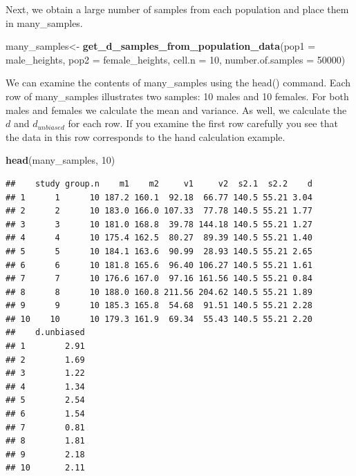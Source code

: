 \documentclass[
]{krantz}
\makeatletter
\newenvironment{Shaded}{\begin{snugshade}}{\end{snugshade}}
\newcommand{\DataTypeTok}[1]{\textcolor[rgb]{0.27,0.27,0.27}{#1}}
\newcommand{\DecValTok}[1]{\textcolor[rgb]{0.06,0.06,0.06}{#1}}
\newcommand{\KeywordTok}[1]{\textcolor[rgb]{0.27,0.27,0.27}{\textbf{#1}}}
\newcommand{\NormalTok}[1]{#1}
\newcommand{\OperatorTok}[1]{\textcolor[rgb]{0.43,0.43,0.43}{\textbf{#1}}}
\newcommand{\StringTok}[1]{\textcolor[rgb]{0.5,0.5,0.5}{#1}}
\newenvironment{kframe}{%
\medskip{}
\setlength{\fboxsep}{.8em}
 \def\at@end@of@kframe{}%
 \ifinner\ifhmode%
  \def\at@end@of@kframe{\end{minipage}}%
  \begin{minipage}{\columnwidth}%
 \fi\fi%
 \def\FrameCommand##1{\hskip\@totalleftmargin \hskip-\fboxsep
 \colorbox{shadecolor}{##1}\hskip-\fboxsep
     \hskip-\linewidth \hskip-\@totalleftmargin \hskip\columnwidth}%
 \MakeFramed {\advance\hsize-\width
   \@totalleftmargin\z@ \linewidth\hsize
   \@setminipage}}%
 {\par\unskip\endMakeFramed%
 \at@end@of@kframe}
\renewenvironment{Shaded}{\begin{kframe}}{\end{kframe}}
\makeatother
\begin{document}
\begin{Shaded}
\end{Shaded}

Next, we obtain a large number of samples from each population and place them in many\_samples.

\begin{Shaded}
\begin{Highlighting}[]
\NormalTok{many_samples<-}\StringTok{  }\KeywordTok{get_d_samples_from_population_data}\NormalTok{(}\DataTypeTok{pop1 =}\NormalTok{ male_heights,}
                                   \DataTypeTok{pop2 =}\NormalTok{ female_heights,}
                                   \DataTypeTok{cell.n =} \DecValTok{10}\NormalTok{,}
                                   \DataTypeTok{number.of.samples =} \DecValTok{50000}\NormalTok{)}
\end{Highlighting}
\end{Shaded}

We can examine the contents of many\_samples using the head() command. Each row of many\_samples illustrates two samples: 10 males and 10 females. For both males and females we calculate the mean and variance. As well, we calculate the \(d\) and \(d_{unbiased}\) for each row. If you examine the first row carefully you see that the data in this row corresponds to the hand calculation example.

\begin{Shaded}
\begin{Highlighting}[]
\KeywordTok{head}\NormalTok{(many_samples, }\DecValTok{10}\NormalTok{)}
\end{Highlighting}
\end{Shaded}

\begin{verbatim}
##    study group.n    m1    m2     v1     v2  s2.1  s2.2    d
## 1      1      10 187.2 160.1  92.18  66.77 140.5 55.21 3.04
## 2      2      10 183.0 166.0 107.33  77.78 140.5 55.21 1.77
## 3      3      10 181.0 168.8  39.78 144.18 140.5 55.21 1.27
## 4      4      10 175.4 162.5  80.27  89.39 140.5 55.21 1.40
## 5      5      10 184.1 163.6  90.99  28.93 140.5 55.21 2.65
## 6      6      10 181.8 165.6  96.40 106.27 140.5 55.21 1.61
## 7      7      10 176.6 167.0  97.16 161.56 140.5 55.21 0.84
## 8      8      10 188.0 160.8 211.56 204.62 140.5 55.21 1.89
## 9      9      10 185.3 165.8  54.68  91.51 140.5 55.21 2.28
## 10    10      10 179.3 161.9  69.34  55.43 140.5 55.21 2.20
##    d.unbiased
## 1        2.91
## 2        1.69
## 3        1.22
## 4        1.34
## 5        2.54
## 6        1.54
## 7        0.81
## 8        1.81
## 9        2.18
## 10       2.11
\end{verbatim}
\end{document}
